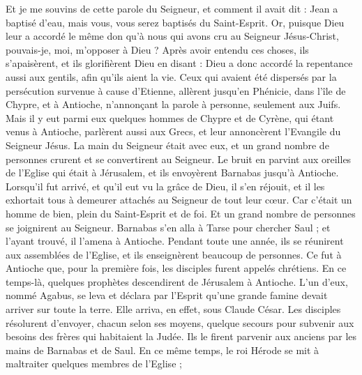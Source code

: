 \begin{multicols}{2}
Et je me souvins de cette parole du Seigneur, et comment il avait dit : Jean a baptisé d'eau, mais vous, vous serez baptisés du Saint-Esprit.
Or, puisque Dieu leur a accordé le même don qu'à nous qui avons cru au Seigneur Jésus-Christ, pouvais-je, moi, m'opposer à Dieu ?
Après avoir entendu ces choses, ils s'apaisèrent, et ils glorifièrent Dieu en disant : Dieu a donc accordé la repentance aussi aux gentils, afin qu’ils aient la vie.
Ceux qui avaient été dispersés par la persécution survenue à cause d'Etienne, allèrent jusqu'en Phénicie, dans l’île de Chypre, et à Antioche, n’annonçant la parole à personne, seulement aux Juifs.
Mais il y eut parmi eux quelques hommes de Chypre et de Cyrène, qui étant venus à Antioche, parlèrent aussi aux Grecs, et leur annoncèrent l’Evangile du Seigneur Jésus.
La main du Seigneur était avec eux, et un grand nombre de personnes crurent et se convertirent au Seigneur.
Le bruit en parvint aux oreilles de l'Eglise qui était à Jérusalem, et ils envoyèrent Barnabas jusqu’à Antioche.
Lorsqu’il fut arrivé, et qu’il eut vu la grâce de Dieu, il s'en réjouit, et il les exhortait tous à demeurer attachés au Seigneur de tout leur cœur.
Car c’était un homme de bien, plein du Saint-Esprit et de foi. Et un grand nombre de personnes se joignirent au Seigneur.
Barnabas s'en alla à Tarse pour chercher Saul ;
et l'ayant trouvé, il l’amena à Antioche. Pendant toute une année, ils se réunirent aux assemblées de l’Eglise, et ils enseignèrent beaucoup de personnes. Ce fut à Antioche que, pour la première fois, les disciples furent appelés chrétiens.
En ce temps-là, quelques prophètes descendirent de Jérusalem à Antioche.
L’un d'eux, nommé Agabus, se leva et déclara par l'Esprit qu'une grande famine devait arriver sur toute la terre. Elle arriva, en effet, sous Claude César.
Les disciples résolurent d’envoyer, chacun selon ses moyens, quelque secours pour subvenir aux besoins des frères qui habitaient la Judée.
Ils le firent parvenir aux anciens par les mains de Barnabas et de Saul.
\VerseOne{}En ce même temps, le roi Hérode se mit à maltraiter quelques membres de l'Eglise ;

\end{multicols}
